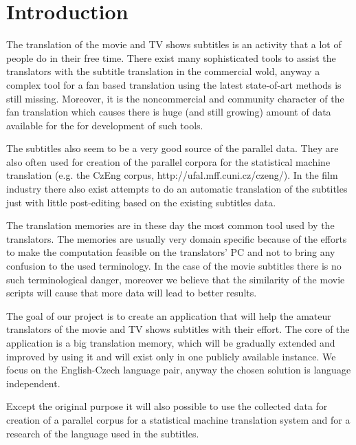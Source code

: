 \chapter{Introduction}

The translation of the movie and TV shows subtitles is an activity that a lot of people do in their free time. There exist many sophisticated tools to assist the translators with the subtitle translation in the commercial wold, anyway a complex tool for a fan based translation using the latest state-of-art methods is still missing. Moreover, it is the noncommercial and community character of the fan translation which causes there is huge (and still growing) amount of data available for the for development of such tools.

The subtitles also seem to be a very good source of the parallel data. They are also often used for creation of the parallel corpora for the statistical machine translation (e.g. the CzEng corpus, http://ufal.mff.cuni.cz/czeng/). In the film industry there also exist attempts to do an automatic translation of the subtitles just with little post-editing based on the existing subtitles data.

The translation memories are in these day the most common tool used by the translators. The memories are usually very domain specific because of the efforts to make the computation feasible on the translators' PC and not to  bring any confusion to the used terminology. In the case of the movie subtitles there is no such terminological danger, moreover we believe that the similarity of the movie scripts will cause that more data will lead to better results.

The goal of our project is to create an application that will help the amateur translators of the movie and TV shows subtitles with their effort. The core of the application is a big translation memory, which will be gradually extended and improved by using it and will exist only in one publicly available instance. We focus on the English-Czech language pair, anyway the chosen solution is language independent.

Except the original purpose it will also possible to use the collected data for creation of a parallel corpus for a statistical machine translation system and for a research of the language used in the subtitles.
